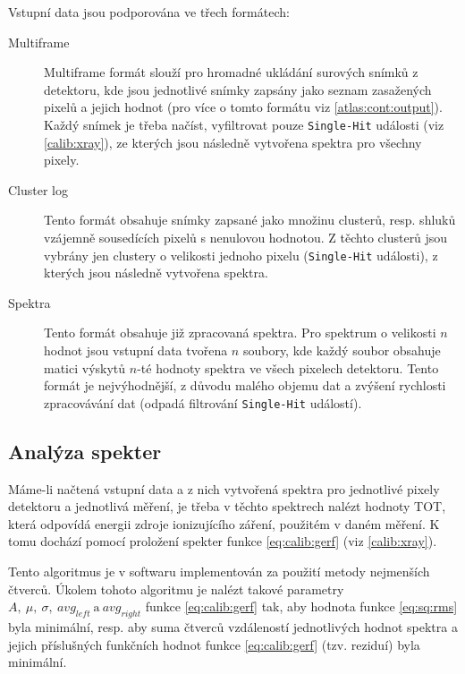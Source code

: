 Vstupní data jsou podporována ve třech formátech:
\begin{description}
	\item[Multiframe] Multiframe formát slouží pro hromadné ukládání surových snímků z detektoru, kde jsou jednotlivé snímky zapsány jako seznam zasažených pixelů a jejich hodnot (pro více o tomto formátu viz \ref{atlas:cont:output}). Každý snímek je třeba načíst, vyfiltrovat pouze \texttt{Single-Hit} události (viz \ref{calib:xray}), ze kterých jsou následně vytvořena spektra pro všechny pixely.
	\item[Cluster log] Tento formát obsahuje snímky zapsané jako množinu clusterů, resp. shluků vzájemně sousedících pixelů s nenulovou hodnotou. Z těchto clusterů jsou vybrány jen clustery o velikosti jednoho pixelu (\texttt{Single-Hit} události), z kterých jsou následně vytvořena spektra.
	\item[Spektra] Tento formát obsahuje již zpracovaná spektra. Pro spektrum o velikosti $n$ hodnot jsou vstupní data tvořena $n$ soubory, kde každý soubor obsahuje matici výskytů $n$-té hodnoty spektra ve všech pixelech detektoru. Tento formát je nejvýhodnější, z důvodu malého objemu dat a zvýšení rychlosti zpracovávání dat (odpadá filtrování \texttt{Single-Hit} událostí).
\end{description}


\subsection{Analýza spekter}\label{calib:sw:spektra}
Máme-li načtená vstupní data a z nich vytvořená spektra pro jednotlivé pixely detektoru a jednotlivá měření, je třeba v těchto spektrech nalézt hodnoty TOT, která odpovídá energii zdroje ionizujícího záření, použitém v daném měření. K tomu dochází pomocí proložení spekter funkce \ref{eq:calib:gerf} (viz \ref{calib:xray}). 

Tento algoritmus je v softwaru implementován za použití metody nejmenších čtverců. Úkolem tohoto algoritmu je nalézt takové parametry $A,~\mu,~\sigma,~avg_{left}~\text{a}~avg_{right}$ funkce \ref{eq:calib:gerf} tak, aby hodnota funkce \ref{eq:sq:rms} byla minimální, resp. aby suma čtverců vzdáleností jednotlivých hodnot spektra a jejich příslušných funkčních hodnot funkce \ref{eq:calib:gerf} (tzv. reziduí) byla minimální.

